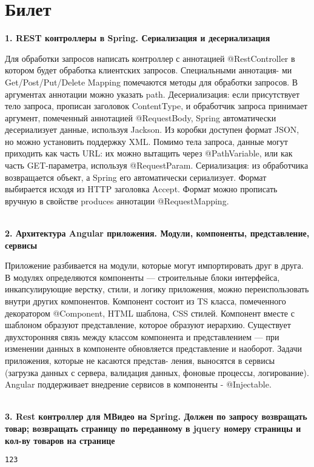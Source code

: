 \documentclass{article}
\newcommand{\bil}[5]{%
        \section{Билет}
        \textbf{1. #1}

        #4
        \\
        \textbf{2. #2}
        
        #5
        \\
        \textbf{3. #3}
}
\begin{document}
\bil{REST контроллеры в Spring. Сериализация и десериализация}
{Архитектура Angular приложения. Модули, компоненты, представление, сервисы}
{Rest контроллер для МВидео на Spring. Должен по запросу возвращать товар; возвращать страницу по переданному в jquery номеру страницы и кол-ву товаров на странице}{
    Для обработки запросов написать контроллер с аннотацией @RestController в котором будет обработка клиентских запросов. 
    Специальными аннотация- ми Get/Post/Put/Delete Mapping помечаются методы для обработки запросов. В аргументах аннотации можно указать path.
    Десериализация: если присутствует тело запроса, прописан заголовок ContentType, и обработчик запроса принимает аргумент, помеченный аннотацией @RequestBody, Spring автоматически десериализует данные, используя Jackson. Из коробки доступен формат JSON, но можно установить поддержку XML.
    Помимо тела запроса, данные могут приходить как часть URL: их можно вытащить через @PathVariable, или как часть GET-параметра, используя @RequestParam. 
    Сериализация: из обработчика возвращается объект, а Spring его автоматически сериализует. Формат выбирается исходя из HTTP заголовка Accept. Формат можно прописать вручную в свойстве produces аннотации @RequestMapping.
}{
    Приложение разбивается на модули, которые могут импортировать друг в друга. В модулях определяются компоненты — строительные блоки интерфейса, инкапсулирующие верстку, стили, и логику приложения, можно переиспользовать внутри других компонентов. 
    Компонент состоит из TS класса, помеченного декоратором @Component, HTML шаблона, CSS стилей. Компонент вместе с шаблоном образуют представление, которое образуют иерархию. Существует двухсторонняя связь между классом компонента и представлением — при изменении данных в компоненте обновляется представление и наоборот. 
    Задачи приложения, которые не касаются представ- ления, выносятся в сервисы (загрузка данных с сервера, валидация данных, фоновые процессы, логирование). 
    Angular поддерживает внедрение сервисов в компоненты - @Injectable.
}
\begin{lstlisting}[frame=single, basicstyle=\ttfamily, breaklines=true, breakatwhitespace=true, postbreak=\mbox{\textcolor{red}{$\hookrightarrow$}\space}]
123
\end{lstlisting}
\end{document}
